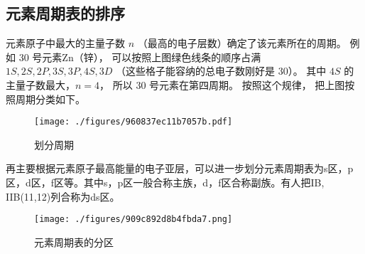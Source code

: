 \subsection{元素周期表的排序}


元素原子中最大的主量子数 $n$ （最高的电子层数）确定了该元素所在的周期。 例如 30 号元素Zn（锌）， 可以按照上图绿色线条的顺序占满 $1S, 2S, 2P, 3S, 3P, 4S, 3D$ （这些格子能容纳的总电子数刚好是 30）。 其中 $4S$ 的主量子数最大，$n=4$， 所以 30 号元素在第四周期。 按照这个规律， 把上图按照周期分类如下。
\begin{figure}[ht]
\centering
\texttt{[image: ./figures/960837ec11b7057b.pdf]}
\caption{划分周期} \label{fig_Ptable_5}
\end{figure}

再主要根据元素原子最高能量的电子亚层，可以进一步划分元素周期表为s区，p区，d区，f区等。其中s，p区一般合称主族，d，f区合称副族。有人把IB, IIB(11,12)列合称为ds区。
\begin{figure}[ht]
\centering
\texttt{[image: ./figures/909c892d8b4fbda7.png]}
\caption{元素周期表的分区} \label{fig_Ptable_3}
\end{figure}

